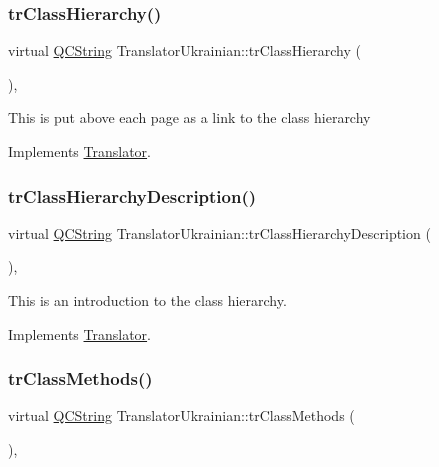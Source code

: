 \subsubsection{\texorpdfstring{trClassHierarchy()}{trClassHierarchy()}}
{\footnotesize\ttfamily virtual \mbox{\hyperlink{class_q_c_string}{Q\+C\+String}} Translator\+Ukrainian\+::tr\+Class\+Hierarchy (\begin{DoxyParamCaption}{ }\end{DoxyParamCaption})\hspace{0.3cm}{\ttfamily [inline]}, {\ttfamily [virtual]}}

This is put above each page as a link to the class hierarchy 

Implements \mbox{\hyperlink{class_translator}{Translator}}.

\mbox{\label{class_translator_ukrainian_a3775c805f620a00e80d9abea1c119e6a}} 
\subsubsection{\texorpdfstring{trClassHierarchyDescription()}{trClassHierarchyDescription()}}
{\footnotesize\ttfamily virtual \mbox{\hyperlink{class_q_c_string}{Q\+C\+String}} Translator\+Ukrainian\+::tr\+Class\+Hierarchy\+Description (\begin{DoxyParamCaption}{ }\end{DoxyParamCaption})\hspace{0.3cm}{\ttfamily [inline]}, {\ttfamily [virtual]}}

This is an introduction to the class hierarchy. 

Implements \mbox{\hyperlink{class_translator}{Translator}}.

\mbox{\label{class_translator_ukrainian_a6c99105ef53492ef8df03788bb417727}} 
\subsubsection{\texorpdfstring{trClassMethods()}{trClassMethods()}}
{\footnotesize\ttfamily virtual \mbox{\hyperlink{class_q_c_string}{Q\+C\+String}} Translator\+Ukrainian\+::tr\+Class\+Methods (\begin{DoxyParamCaption}{ }\end{DoxyParamCaption})\hspace{0.3cm}{\ttfamily [inline]}, {\ttfamily [virtual]}}

